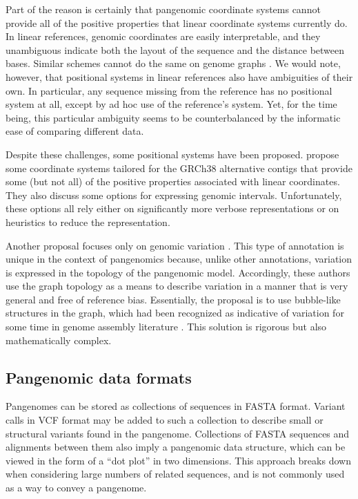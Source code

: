 Part of the reason is certainly that pangenomic coordinate systems cannot provide all of the positive properties that linear coordinate systems currently do.
In linear references, genomic coordinates are easily interpretable, and they unambiguous indicate both the layout of the sequence and the distance between bases.
Similar schemes cannot do the same on genome graphs \cite{Rand_2017}.
We would note, however, that positional systems in linear references also have ambiguities of their own.
In particular, any sequence missing from the reference has no positional system at all, except by ad hoc use of the reference's system.
Yet, for the time being, this particular ambiguity seems to be counterbalanced by the informatic ease of comparing different data.

Despite these challenges, some positional systems have been proposed.
\citeauthor{Rand_2017} propose some coordinate systems tailored for the GRCh38 alternative contigs that provide some (but not all) of the positive properties associated with linear coordinates.
They also discuss some options for expressing genomic intervals.
Unfortunately, these options all rely either on significantly more verbose representations or on heuristics to reduce the representation.

Another proposal focuses only on genomic variation \cite{paten2018superbubbles}.
This type of annotation is unique in the context of pangenomics because, unlike other annotations, variation is expressed in the topology of the pangenomic model.
Accordingly, these authors use the graph topology as a means to describe variation in a manner that is very general and free of reference bias.
Essentially, the proposal is to use bubble-like structures in the graph, which had been recognized as indicative of variation for some time in genome assembly literature \cite{Iqbal_2012, Onodera_2013}.
This solution is rigorous but also mathematically complex.

\subsection{Pangenomic data formats}

Pangenomes can be stored as collections of sequences in FASTA format.
Variant calls in VCF format may be added to such a collection to describe small or structural variants found in the pangenome.
Collections of FASTA sequences and alignments between them also imply a pangenomic data structure, which can be viewed in the form of a ``dot plot'' in two dimensions.
This approach breaks down when considering large numbers of related sequences, and is not commonly used as a way to convey a pangenome.

